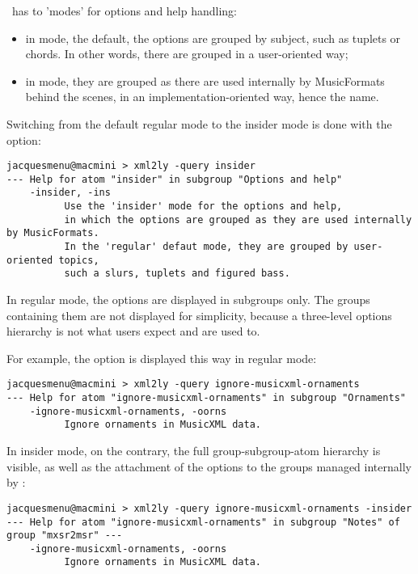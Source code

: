 \mf\ has to 'modes' for options and help handling:
\begin{itemize}
\item in  mode, the default, the options are grouped by subject, such as tuplets or chords. In other words, there are grouped in a user-oriented way;
\item in  mode, they are grouped as there are used internally by MusicFormats behind the scenes, in an implementation-oriented way, hence the name.
\end{itemize}

Switching from the default regular mode to the insider mode is done with the  option:
\begin{lstlisting}[language=Terminal]
jacquesmenu@macmini > xml2ly -query insider
--- Help for atom "insider" in subgroup "Options and help"
    -insider, -ins
          Use the 'insider' mode for the options and help,
          in which the options are grouped as they are used internally by MusicFormats.
          In the 'regular' defaut mode, they are grouped by user-oriented topics,
          such a slurs, tuplets and figured bass.
\end{lstlisting}

In regular mode, the options are displayed in subgroups only. The groups containing them are not displayed for simplicity, because a three-level options hierarchy is not what users expect and are used to.

For example, the  option is displayed this way in regular mode:
\begin{lstlisting}[language=Terminal]
jacquesmenu@macmini > xml2ly -query ignore-musicxml-ornaments
--- Help for atom "ignore-musicxml-ornaments" in subgroup "Ornaments"
    -ignore-musicxml-ornaments, -oorns
          Ignore ornaments in MusicXML data.
\end{lstlisting}

In insider mode, on the contrary, the full group-subgroup-atom hierarchy is visible, as well as the attachment of the options to the groups managed internally by \mf:
\begin{lstlisting}[language=Terminal]
jacquesmenu@macmini > xml2ly -query ignore-musicxml-ornaments -insider
--- Help for atom "ignore-musicxml-ornaments" in subgroup "Notes" of group "mxsr2msr" ---
    -ignore-musicxml-ornaments, -oorns
          Ignore ornaments in MusicXML data.
\end{lstlisting}


